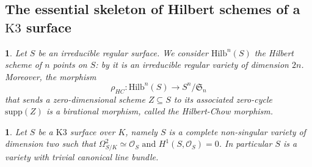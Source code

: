 \documentclass{amsart}%
\numberwithin{equation}{subsection}
\theoremstyle{plain2}
\theoremstyle{definition2}
\theoremstyle{stepstyle}
\theoremstyle{point}
\theoremstyle{subpoint}
\newtheorem{subpoint}[equation]{}%
\newcommand{\spa}[1]{\begin{subpoint}#1\end{subpoint}}           %
\newcommand{\caO}{\ensuremath{\mathcal{O}}}
\newcommand{\Hilb}{\ensuremath{\mathrm{Hilb}}}
\begin{document}
\subsection{The essential skeleton of Hilbert schemes of a $\text{K3}$ surface} \label{sect essential sk Hilb}

\spa{Let $S$ be an irreducible regular surface. We consider $\Hilb^n(S)$ the Hilbert scheme of $n$ points on $S$: by \cite{Fogarty} it is an irreducible regular variety of dimension $2n$. Moreover, the morphism $$\rho_{HC}: \Hilb^n(S) \rightarrow S^n/\mathfrak{S}_n$$ that sends a zero-dimensional scheme $Z \subseteq S$ to its associated zero-cycle $\text{supp}(Z)$ is a birational morphism, called the Hilbert-Chow morphism.}

\spa{Let $S$ be a $\text{K}3$ surface over $K$, namely $S$ is a complete non-singular variety of dimension two such that $\Omega_{S/K}^2 \simeq \caO_S \text{ and } H^1(S,\caO_S) = 0$. In particular $S$ is a variety with trivial canonical line bundle. 
}
\end{document}
